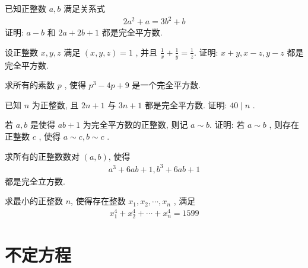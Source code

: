 \documentclass[aspectratio=169]{ctexbeamer}
\theoremstyle{definition}
\begin{document}
\begin{frame}[t]
\begin{example}
	已知正整数 $a ,  b$ 满足关系式
	\begin{align*}
		2 a^{2}+a=3 b^{2}+b
	\end{align*}
	证明: $a-b$ 和 $2 a+2 b+1$ 都是完全平方数.
\end{example}
\end{frame}

\begin{frame}[t]
\begin{example}
	设正整数 $x ,  y ,  z$ 满足 $(x, y, z)=1$ , 并且 $\frac{1}{x}+\frac{1}{y}=\frac{1}{z}$. 证明:  $x+y ,  x-z ,  y-z$ 都是完全平方数.
\end{example}
\end{frame}

\begin{frame}[t]
\begin{example}
	求所有的素数 $p$ , 使得 $p^{3}-4 p+9$ 是一个完全平方数.
\end{example}
\end{frame}

\begin{frame}[t]
\begin{example}
	已知 $n$ 为正整数, 且 $2 n+1$ 与 $3 n+1$ 都是完全平方数. 证明:  $40 \mid n$ .
\end{example}
\end{frame}

\begin{frame}[t]
\begin{example}
	若 $a ,  b$ 是使得 $a b+1$ 为完全平方数的正整数, 则记 $a \sim b$. 证明: 若 $a \sim b$ , 则存在正整数 $c$ , 使得 $a \sim c, b \sim c$ .
\end{example}
\end{frame}

\begin{frame}[t]
\begin{example}
	求所有的正整数数对 $(a, b)$, 使得
	\begin{align*}
		a^{3}+6 a b+1, b^{3}+6 a b+1
	\end{align*}
	都是完全立方数.
\end{example}
\end{frame}

\begin{frame}[t]
\begin{example}
	求最小的正整数 $n$, 使得存在整数 $x_{1}, x_{2}, \cdots, x_{n}$ , 满足
	\begin{align*}
		x_{1}^{4}+x_{2}^{4}+\cdots+x_{n}^{4}=1599
	\end{align*}
\end{example}
\end{frame}


\section{不定方程}
\end{document}
